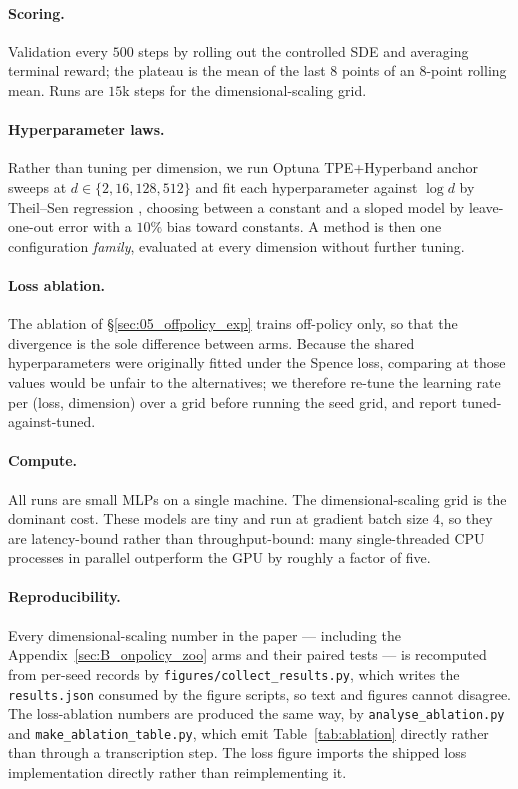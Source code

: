 \paragraph{Scoring.}
Validation every $500$ steps by rolling out the controlled SDE and averaging
terminal reward; the plateau is the mean of the last $8$ points of an
$8$-point rolling mean. Runs are $15$k steps for the dimensional-scaling grid.

\paragraph{Hyperparameter laws.}
Rather than tuning per dimension, we run Optuna \citep{akiba2019optuna} TPE+Hyperband \citep{li2018hyperband} anchor sweeps at
$d\in\{2,16,128,512\}$ and fit each hyperparameter against $\log d$ by
Theil--Sen regression \citep{theil1950rank}, choosing between a constant and a sloped model by
leave-one-out error with a $10\%$ bias toward constants. A method is then one
configuration \emph{family}, evaluated at every dimension without further
tuning.

\paragraph{Loss ablation.}
The ablation of \S\ref{sec:05_offpolicy_exp} trains off-policy only, so that
the divergence is the sole difference between arms. Because the shared
hyperparameters were originally fitted under the Spence loss, comparing at
those values would be unfair to the alternatives; we therefore re-tune the
learning rate per (loss, dimension) over a grid before running the seed grid,
and report tuned-against-tuned.

\paragraph{Compute.}
All runs are small MLPs on a single machine. The dimensional-scaling grid is
the dominant cost. These models are tiny and run at gradient batch size $4$, so they are
latency-bound rather than throughput-bound: many single-threaded CPU processes
in parallel outperform the GPU by roughly a factor of five.

\paragraph{Reproducibility.}
Every dimensional-scaling number in the paper --- including the
Appendix~\ref{sec:B_onpolicy_zoo} arms and their paired tests --- is recomputed
from per-seed records by \texttt{figures/collect\_results.py}, which writes the
\texttt{results.json} consumed by the figure scripts, so text and figures
cannot disagree. The loss-ablation numbers are produced the same way, by
\texttt{analyse\_ablation.py} and \texttt{make\_ablation\_table.py}, which emit
Table~\ref{tab:ablation} directly rather than through a transcription step. The loss figure imports the shipped loss implementation
directly rather than reimplementing it.
